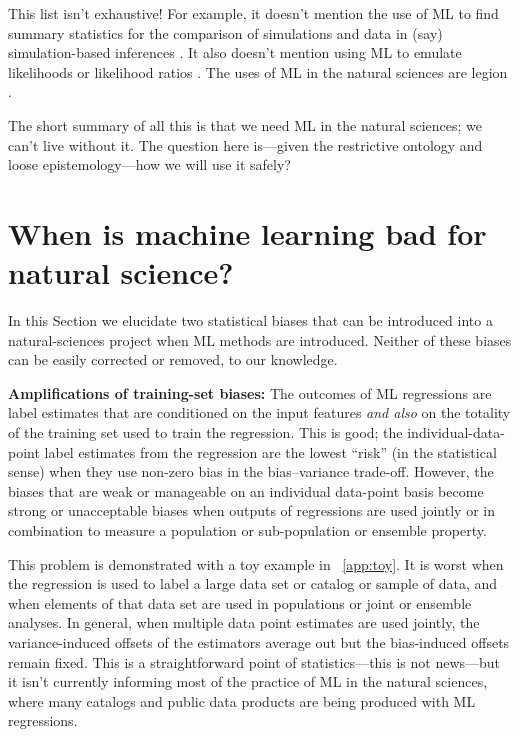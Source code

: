 \documentclass{article}
\renewcommand{\paragraph}[1]{\noindent\par\textbf{#1}}
\newcommand{\sectionname}{Section}
\begin{document}
\medskip
This list isn't exhaustive!
For example, it doesn't mention the use of ML to find summary statistics for the comparison of simulations and data in (say) simulation-based inferences \cite{sbi, simbig}.
It also doesn't mention using ML to emulate likelihoods or likelihood ratios \cite{biwei, likelihood_ratio}.
The uses of ML in the natural sciences are legion \cite{wang2023scientific,zhang2023artificial}.

The short summary of all this is that we need ML in the natural sciences; we can't live without it.
The question here is---given the restrictive ontology and loose epistemology---how we will use it safely?

\section{When is machine learning bad for natural science?}\label{sec:bad}
In this \sectionname{} we elucidate two statistical biases that can be introduced into a natural-sciences project when ML methods are introduced.
Neither of these biases can be easily corrected or removed, to our knowledge.

\paragraph{Amplifications of training-set biases:}
The outcomes of ML regressions are label estimates that are conditioned on the input features \emph{and also} on the totality of the training set used to train the regression.
This is good; the individual-data-point label estimates from the regression are the lowest ``risk'' (in the statistical sense) when they use non-zero bias in the bias--variance trade-off.
However, the biases that are weak or manageable on an individual data-point basis become strong or unacceptable biases when outputs of regressions are used jointly or in combination to measure a population or sub-population or ensemble property.

This problem is demonstrated with a toy example in \appendixname~\ref{app:toy}.
It is worst when the regression is used to label a large data set or catalog or sample of data,
and when elements of that data set are used in populations or joint or ensemble analyses.
In general, when multiple data point estimates are used jointly, the variance-induced offsets of the estimators average out but the bias-induced offsets remain fixed.
This is a straightforward point of statistics---this is not news---but it isn't currently informing most of the practice of ML in the natural sciences, where many catalogs and public data products are being produced with ML regressions.
\end{document}

